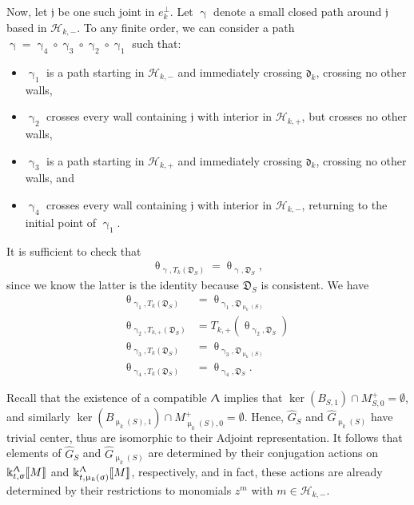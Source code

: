 \documentclass{amsart}
\let\llb=\llbracket
\let\rrb=\rrbracket
\let\f=\mathfrak
\let\s=\mathcal
\newcommand {\kk} {\Bbbk}
\renewcommand{\theta}{\uptheta}
\renewcommand{\gamma}{\upgamma}
\renewcommand{\sigma}{\upsigma}
\renewcommand{\Lambda}{\Uplambda}
\renewcommand{\mu}{\upmu}
\theoremstyle{plain}%
\theoremstyle{definition}
\theoremstyle{remark}
\newenvironment{myproof}[1][\proofname]{\proof[#1]\mbox{}}{\endproof}
\begin{document}
\begin{myproof}[Proof of Proposition \ref{mut-inv}]
Now, let $\f{j}$ be one such joint in $e_k^{\perp}$. Let $\gamma$ denote a small closed path around $\f{j}$ based in $\s{H}_{k,-}$.  To any finite order, we can consider a path $\gamma=\gamma_4\circ \gamma_3\circ \gamma_2\circ \gamma_1$ such that:
\begin{itemize}
    \item $\gamma_1$ is a path starting in $\s{H}_{k,-}$ and immediately crossing $\f{d}_k$, crossing no other walls,
    \item $\gamma_2$ crosses every wall containing $\f{j}$ with interior in $\s{H}_{k,+}$, but crosses no other walls,
    \item $\gamma_3$ is a path starting in $\s{H}_{k,+}$ and immediately crossing $\f{d}_k$, crossing no other walls, and    
    \item $\gamma_4$ crosses every wall containing $\f{j}$ with interior in $\s{H}_{k,-}$, returning to the initial point of $\gamma_1$.
\end{itemize}
 



It is sufficient to check that 
\begin{align}\label{thetaEq}
    \theta_{\gamma,T_k(\f{D}_S)}=\theta_{\gamma,\f{D}_S},
\end{align} since we know the latter is the identity because $\f{D}_S$ is consistent. 
We have
\begin{align*}
    {\theta_{\gamma_1,T_k(\f{D}_S)}}&={\theta_{\gamma_1,\f{D}_{\mu_k(S)}}} \\
    {\theta_{\gamma_2,T_{k,+}(\f{D}_S)}}&=T_{k,+}(\theta_{\gamma_2,\f{D}_S})  \\
    \theta_{\gamma_3,T_k(\f{D}_S)}&=\theta_{\gamma_3,\f{D}_{\mu_k(S)}} \\
    \theta_{\gamma_4,T_k(\f{D}_S)}&=\theta_{\gamma_4,\f{D}_S}.
\end{align*}

Recall that the existence of a compatible $\Lambda$ implies that $\ker(B_{S,1})\cap M_{S,0}^+=\emptyset$, and similarly $\ker(B_{\mu_k(S),1})\cap M_{\mu_k(S),0}^+=\emptyset$.  Hence, $\hat{G}_S$ and $\hat{G}_{\mu_k(S)}$ have trivial center, thus are isomorphic to their Adjoint representation.  It follows that elements of $\hat{G}_S$ and $\hat{G}_{\mu_k(S)}$ are determined by their conjugation actions on $\kk_{t,\sigma}^{\Lambda}\llb M\rrb$ and $\kk_{t,\mu_k(\sigma)}^{\Lambda}\llb M\rrb$, respectively, and in fact, these actions are already determined by their restrictions to monomials $z^m$ with $m\in \s{H}_{k,-}$.


\end{myproof}
\end{document}
